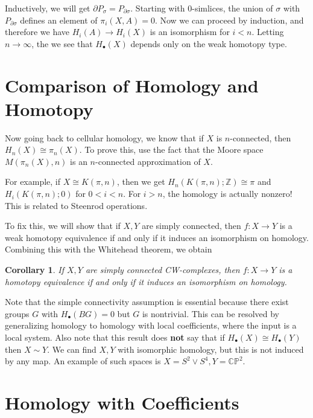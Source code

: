 \documentclass[leqno, openany]{memoir}
\newtheorem{cor}[thm]{Corollary}
\theoremstyle{definition}
\theoremstyle{remark}
\theoremstyle{plain}
\theoremstyle{definition}
\theoremstyle{remark}
\newcommand{\C}{\mathbb{C}}
\newcommand{\Z}{\mathbb{Z}}
\renewcommand{\P}{\mathbb{P}}
\begin{document}
Inductively, we will get $\partial P_{\sigma} = P_{\partial \sigma}$. Starting with $0$-simlices, the union of $\sigma$ with $P_{\partial \sigma}$ defines an element of $\pi_i(X, A) = 0$. Now we can proceed by induction, and therefore we have $H_i(A) \to H_i(X)$ is an isomorphism for $i < n$. Letting $n \to \infty$, the we see that $H_{\bullet}(X)$ depends only on the weak homotopy type.

\section{Comparison of Homology and Homotopy}%
\label{sec:comparison_of_homology_and_homotopy}

Now going back to cellular homology, we know that if $X$ is $n$-connected, then $H_n(X) \cong \pi_n(X)$. To prove this, use the fact that the Moore space $M(\pi_n(X), n)$ is an $n$-connected approximation of $X$.

For example, if $X \cong K(\pi, n)$, then we get $H_n(K(\pi, n); \Z) \cong \pi$ and $H_i(K(\pi, n); 0)$ for $0 < i < n$. For $i > n$, the homology is actually nonzero! This is related to Steenrod operations.

To fix this, we will show that if $X,Y$ are simply connected, then $f \colon X \to Y$ is a weak homotopy equivalence if and only if it induces an isomorphism on homology. Combining this with the Whitehead theorem, we obtain

\begin{cor}
    If $X,Y$ are simply connected CW-complexes, then $f \colon X \to Y$ is a homotopy equivalence if and only if it induces an isomorphism on homology.
\end{cor}

Note that the simple connectivity assumption is essential because there exist groups $G$ with $H_{\bullet}(BG) = 0$ but $G$ is nontrivial. This can be resolved by generalizing homology to homology with local coefficients, where the input is a local system. Also note that this result does \textbf{not} say that if $H_{\bullet}(X) \cong H_{\bullet}(Y)$ then $X \sim Y$. We can find $X,Y$ with isomorphic homology, but this is not induced by any map. An example of such spaces is $X = S^2 \vee S^4, Y = \C\P^2$.

\section{Homology with Coefficients}%
\label{sec:homology_with_coefficients}
\end{document}
